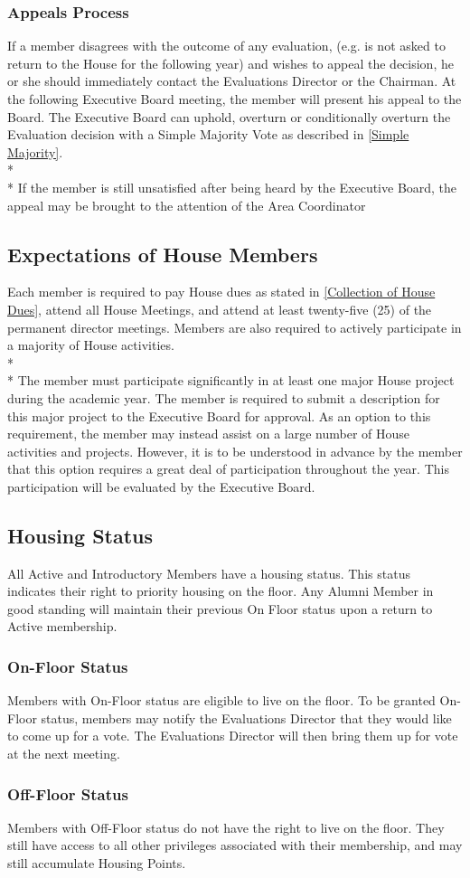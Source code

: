 \documentclass{article}
\newcommand{\bsection}[1]{\subsection{#1} \label{#1}}
\newcommand{\bsubsection}[1]{\subsubsection{#1} \label{#1}}
\begin{document}
\bsubsection{Appeals Process}
If a member disagrees with the outcome of any evaluation, (e.g. is not asked to return to the House for the following year) and wishes to appeal the decision, he or she should immediately contact the Evaluations Director or the Chairman. At the following Executive Board meeting, the member will present his appeal to the Board. The Executive Board can uphold, overturn or conditionally overturn the Evaluation decision with a Simple Majority Vote as described in \ref{Simple Majority}.
\\* \\*
If the member is still unsatisfied after being heard by the Executive Board, the appeal may be brought to the attention of the Area Coordinator

\bsection{Expectations of House Members}
Each member is required to pay House dues as stated in \ref{Collection of House Dues}, attend all House Meetings, and attend at least twenty-five (25) of the permanent director meetings. Members are also required to actively participate in a majority of House activities.
\\* \\*
The member must participate significantly in at least one major House project during the academic year. The member is required to submit a description for this major project to the Executive Board for approval. As an option to this requirement, the member may instead assist on a large number of House activities and projects. However, it is to be understood in advance by the member that this option requires a great deal of participation throughout the year. This participation will be evaluated by the Executive Board.

\bsection{Housing Status}
All Active and Introductory Members have a housing status. This status indicates their right to priority housing on the floor. Any Alumni Member in good standing will maintain their previous On Floor status upon a return to Active membership.
\bsubsection{On-Floor Status}
Members with On-Floor status are eligible to live on the floor. To be granted On-Floor status, members may notify the Evaluations Director that they would like to come up for a vote. The Evaluations Director will then bring them up for vote at the next meeting.
\bsubsection{Off-Floor Status}
Members with Off-Floor status do not have the right to live on the floor. They still have access to all other privileges associated with their membership, and may still accumulate Housing Points.
\end{document}
